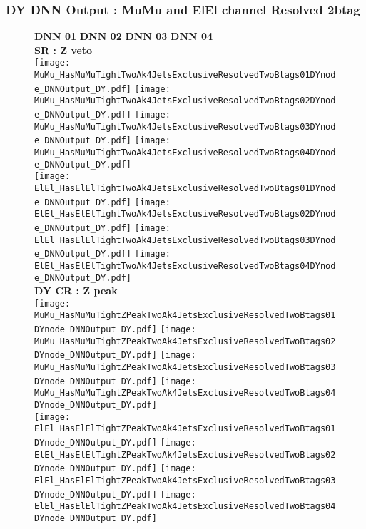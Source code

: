 \documentclass[9pt]{beamer}
\begin{document}
\begin{frame}
	\frametitle{DY DNN Output : MuMu and ElEl channel Resolved 2btag}
	\begin{figure}
	    \textbf{DNN 01} \hspace{1.2cm} \textbf{DNN 02} \hspace{1.2cm} \textbf{DNN 03} \hspace{1.2cm} \textbf{DNN 04} \\
        \centering
        \textbf{SR : Z veto} \\
		\texttt{[image: MuMu\_HasMuMuTightTwoAk4JetsExclusiveResolvedTwoBtags01DYnode\_DNNOutput\_DY.pdf]}
		\texttt{[image: MuMu\_HasMuMuTightTwoAk4JetsExclusiveResolvedTwoBtags02DYnode\_DNNOutput\_DY.pdf]}
		\texttt{[image: MuMu\_HasMuMuTightTwoAk4JetsExclusiveResolvedTwoBtags03DYnode\_DNNOutput\_DY.pdf]}
		\texttt{[image: MuMu\_HasMuMuTightTwoAk4JetsExclusiveResolvedTwoBtags04DYnode\_DNNOutput\_DY.pdf]}\\
		\texttt{[image: ElEl\_HasElElTightTwoAk4JetsExclusiveResolvedTwoBtags01DYnode\_DNNOutput\_DY.pdf]}
		\texttt{[image: ElEl\_HasElElTightTwoAk4JetsExclusiveResolvedTwoBtags02DYnode\_DNNOutput\_DY.pdf]}
		\texttt{[image: ElEl\_HasElElTightTwoAk4JetsExclusiveResolvedTwoBtags03DYnode\_DNNOutput\_DY.pdf]}
		\texttt{[image: ElEl\_HasElElTightTwoAk4JetsExclusiveResolvedTwoBtags04DYnode\_DNNOutput\_DY.pdf]}\\
        \textbf{DY CR : Z peak} \\
		\texttt{[image: MuMu\_HasMuMuTightZPeakTwoAk4JetsExclusiveResolvedTwoBtags01DYnode\_DNNOutput\_DY.pdf]}
		\texttt{[image: MuMu\_HasMuMuTightZPeakTwoAk4JetsExclusiveResolvedTwoBtags02DYnode\_DNNOutput\_DY.pdf]}
		\texttt{[image: MuMu\_HasMuMuTightZPeakTwoAk4JetsExclusiveResolvedTwoBtags03DYnode\_DNNOutput\_DY.pdf]}
		\texttt{[image: MuMu\_HasMuMuTightZPeakTwoAk4JetsExclusiveResolvedTwoBtags04DYnode\_DNNOutput\_DY.pdf]}\\
		\texttt{[image: ElEl\_HasElElTightZPeakTwoAk4JetsExclusiveResolvedTwoBtags01DYnode\_DNNOutput\_DY.pdf]}
		\texttt{[image: ElEl\_HasElElTightZPeakTwoAk4JetsExclusiveResolvedTwoBtags02DYnode\_DNNOutput\_DY.pdf]}
		\texttt{[image: ElEl\_HasElElTightZPeakTwoAk4JetsExclusiveResolvedTwoBtags03DYnode\_DNNOutput\_DY.pdf]}
		\texttt{[image: ElEl\_HasElElTightZPeakTwoAk4JetsExclusiveResolvedTwoBtags04DYnode\_DNNOutput\_DY.pdf]}\\
	\end{figure}
\end{frame}
\end{document}
